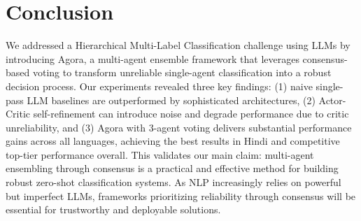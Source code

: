 \section{Conclusion}

We addressed a Hierarchical Multi-Label Classification challenge using LLMs by introducing Agora, a multi-agent ensemble framework that leverages consensus-based voting to transform unreliable single-agent classification into a robust decision process. Our experiments  revealed three key findings: (1) naive single-pass LLM baselines are outperformed by sophisticated architectures, (2) Actor-Critic self-refinement can introduce noise and degrade performance due to critic unreliability, and (3) Agora with 3-agent voting delivers substantial performance gains across all languages, achieving the best results in Hindi and competitive top-tier performance overall. 
This validates our main claim: multi-agent ensembling through consensus is a practical and effective method for building robust zero-shot classification systems. As NLP increasingly relies on powerful but imperfect LLMs, frameworks prioritizing reliability through consensus will be essential for trustworthy and deployable solutions.
